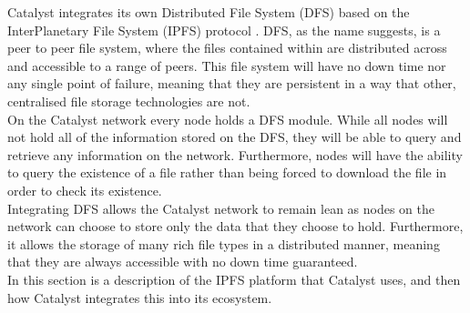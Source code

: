 Catalyst integrates its own Distributed File System (DFS) \cite{DFS} based on the InterPlanetary File System (IPFS) protocol \cite{benet2014ipfs}. DFS, as the name suggests, is a peer to peer file system, where the files contained within are distributed across and accessible to a range of peers. This file system will have no down time nor any single point of failure, meaning that they are persistent in a way that other, centralised file storage technologies are not. \\ %



On the Catalyst network every node holds a DFS module. While all nodes will not hold all of the information stored on the DFS, they will be able to query and retrieve any information on the network. Furthermore, nodes will have the ability to query the existence of a file rather than being forced to download the file in order to check its existence. \\ %

Integrating DFS allows the Catalyst network to remain lean as nodes on the network can choose to store only the data that they choose to hold. Furthermore, it allows the storage of many rich file types in a distributed manner, meaning that they are always accessible with no down time guaranteed. \\ %

In this section is a description of the IPFS platform that Catalyst uses, and then how Catalyst integrates this into its ecosystem.